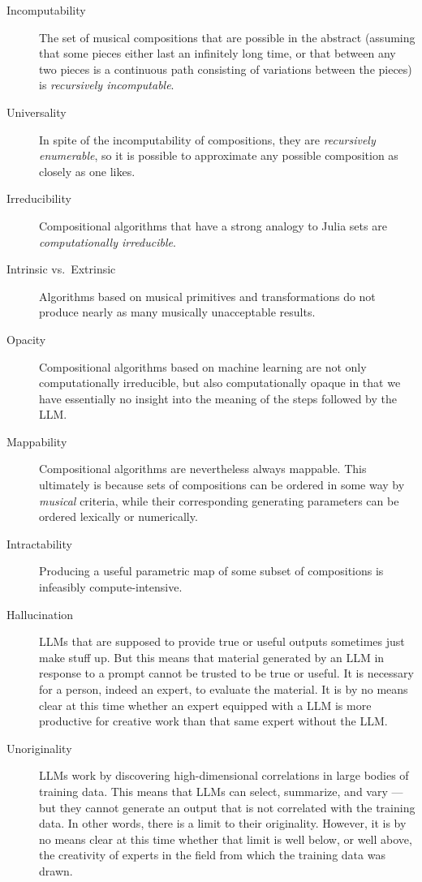 \documentclass[11pt]{scrartcl}
\begin{document}
\begin{description}
\item[Incomputability] The set of musical compositions that are possible in the abstract (assuming that some pieces either last an infinitely long time, or that between any two pieces is a continuous path consisting of variations between the pieces) is \emph{recursively incomputable}.
\item[Universality] In spite of the incomputability of compositions, they are \emph{recursively enumerable}, so it is possible to approximate any possible composition as closely as one likes.
\item[Irreducibility] Compositional algorithms that have a strong analogy to Julia sets are \emph{computationally irreducible}.
\item[Intrinsic vs.\ Extrinsic] Algorithms based on musical primitives and transformations do not produce nearly as many musically unacceptable results.
\item[Opacity] Compositional algorithms based on machine learning are not only computationally irreducible, but also computationally opaque in that we have essentially no insight into the meaning of the steps followed by the LLM.
\item[Mappability] Compositional algorithms are nevertheless always mappable. This ultimately is because sets of compositions can be ordered in some way by \emph{musical} criteria, while their corresponding generating parameters can be ordered lexically or numerically.
\item[Intractability] Producing a useful parametric map of some subset of compositions is infeasibly compute-intensive. 
\item[Hallucination] LLMs that are supposed to provide true or useful outputs sometimes just make stuff up. But this means that material generated by an LLM in response to a prompt cannot be trusted to be true or useful. It is necessary for a person, indeed an expert, to evaluate the material. It is by no means clear at this time whether an expert equipped with a LLM is more productive for creative work than that same expert without the LLM.
\item[Unoriginality] LLMs work by discovering high-dimensional correlations in large bodies of training data. This means that LLMs can select, summarize, and vary --- but they cannot generate an output that is not correlated with the training data. In other words, there is a limit to their originality. However, it is by no means clear at this time whether that limit is well below, or well above, the creativity of experts in the field from which the training data was drawn.
\end{description}
\end{document}
